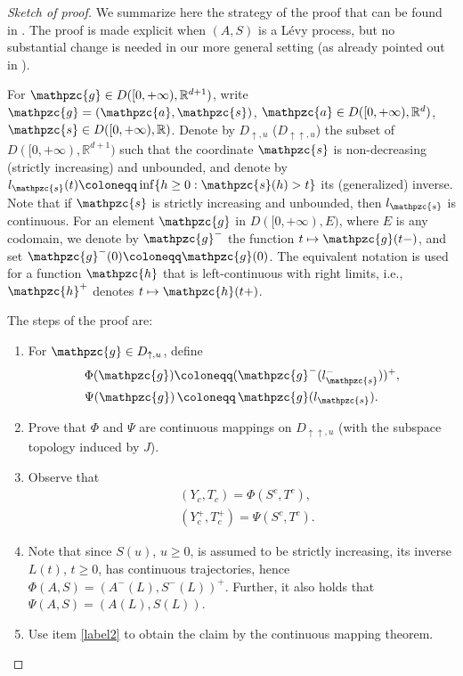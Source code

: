 \documentclass[reqno]{amsart}
\theoremstyle{remark}
\numberwithin{equation}{section} %
\newcommand{\1}{\mathds{1}}
\begin{document}
	\begin{proof}[Sketch of proof]
		We summarize here the strategy of the proof that can be found in \cite{straka2011lagging}. The proof is made explicit when $(A, S)$ is a L\'evy process, but no substantial change is needed in our more general setting (as already pointed out in \cite{Meerschaert2014}).
		
		For $\mathpzc{g} \in D([0, +\infty), \mathbb{R}^{d+1})$, write $\mathpzc{g}=(\mathpzc{a}, \mathpzc{s})$, $\mathpzc{a} \in D([0, +\infty), \mathbb{R}^d)$, $\mathpzc{s} \in D([0, +\infty), \mathbb{R})$. Denote by $D_{\uparrow,u}$ ($D_{\uparrow \uparrow,u}$) the subset of $D([0, +\infty), \mathbb{R}^{d+1})$ such that the coordinate $\mathpzc{s}$ is non-decreasing (strictly increasing) and unbounded, and denote by $l_{\mathpzc{s}} (t) \coloneqq \inf \{ h \geq 0 : \mathpzc{s}(h) > t \}$ its (generalized) inverse. Note that if $\mathpzc{s}$ is strictly increasing and unbounded, then $l_{\mathpzc{s}}$ is continuous. For an element $\mathpzc{g}$ in $D([0, +\infty), E)$, where $E$ is any codomain, we denote by $\mathpzc{g}^-$ the function $t \mapsto \mathpzc{g}(t-)$, and set $\mathpzc{g}^-(0)\coloneqq \mathpzc{g}(0)$. The equivalent notation is used for a function $\mathpzc{h}$ that is left-continuous with right limits, i.e., $\mathpzc{h}^+$ denotes $t \mapsto \mathpzc{h}(t+)$.
		
		The steps of the proof are:
		\begin{enumerate}
			\item For $\mathpzc{g} \in D_{\uparrow, u}$, define
			\begin{align*}
				&  \Phi (\mathpzc{g}) \coloneqq (\mathpzc{g}^- ( l_{\mathpzc{s}}^-))^+, \\
				&  \Psi (\mathpzc{g}) \, \coloneqq \, \mathpzc{g} ({l}_{\mathpzc{s}}).
			\end{align*}
			\item\label{label2} Prove that $\Phi$ and $\Psi$ are continuous mappings on $D_{\uparrow \uparrow, u}$ (with the subspace topology induced by $J$).
			\item Observe that
			\begin{align*}
				& (Y_c, T_c) = \Phi ( S^c, T^c ), \\
				& (Y_c^+,T_c^+) = \Psi ( S^c, T^c ).
			\end{align*}
			\item Note that since $S(u)$, $u\ge0$, is assumed to be strictly increasing, its inverse $L(t)$, $t\ge0$, has continuous trajectories, hence $ \Phi (A, S) = (A^-(L), S^-(L))^+$. Further,  it also holds that $\Psi(A,S) = (A(L), S(L))$.
			\item Use item \eqref{label2} to obtain the claim by the continuous mapping theorem.
		\end{enumerate}
	\end{proof}
	
\end{document}
